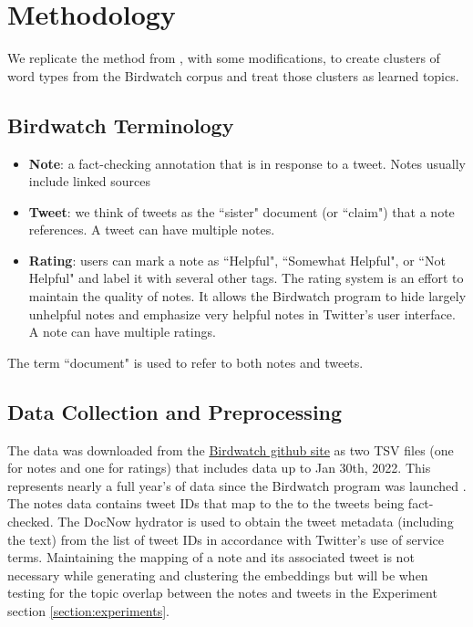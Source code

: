 \documentclass [11pt, proquest] {uwthesis}[2020/02/24]
\begin{document}
\chapter{Methodology}

We replicate the method from \cite{sia-etal-2020-tired}, with some modifications, to create clusters of word types from the Birdwatch corpus and treat those clusters as learned topics.

\section{Birdwatch Terminology}


\begin{itemize}
\item \textbf{Note}: a fact-checking annotation that is in response to a tweet. Notes usually include linked sources
\item \textbf{Tweet}: we think of tweets as the ``sister" document (or ``claim") that a note references. A tweet can have multiple notes.
\item \textbf{Rating}: users can mark a note as ``Helpful", ``Somewhat Helpful", or ``Not Helpful" and label it with several other tags. The rating system is an effort to maintain the quality of notes. It allows the Birdwatch program to hide largely unhelpful notes and emphasize very helpful notes in Twitter's user interface. A note can have multiple ratings.
\end{itemize}

The term ``document" is used to refer to both notes and tweets.


\section{Data Collection and Preprocessing}\label{section:preprocessing}

The data was downloaded from the \href{https://twitter.github.io/birdwatch/download-data/}{Birdwatch github site} as two TSV files (one for notes and one for ratings) that includes data up to Jan 30th, 2022. This represents nearly a full year’s of data since the Birdwatch program was launched \cite{coleman_2021}. The notes data contains tweet IDs that map to the to the tweets being fact-checked. The DocNow hydrator \citep{docnow_hydrator} is used to obtain the tweet metadata (including the text) from the list of tweet IDs in accordance with Twitter’s use of service terms. Maintaining the mapping of a note and its associated tweet is not necessary while generating and clustering the embeddings but will be when testing for the topic overlap between the notes and tweets in the Experiment section \ref{section:experiments}.
\end{document}
